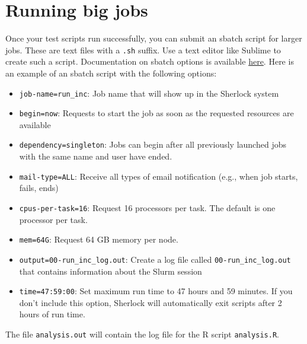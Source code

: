 \documentclass[
]{book}
\providecommand{\tightlist}{%
  \setlength{\itemsep}{0pt}\setlength{\parskip}{0pt}}
\begin{document}
\hypertarget{running-big-jobs-1}{%
\section{Running big jobs}\label{running-big-jobs-1}}

Once your test scripts run successfully, you can submit an sbatch script for larger jobs. These are text files with a \texttt{.sh} suffix. Use a text editor like Sublime to create such a script. Documentation on sbatch options is available \href{https://slurm.schedmd.com/sbatch.html}{here}. Here is an example of an sbatch script with the following options:

\begin{itemize}
\tightlist
\item
  \texttt{job-name=run\_inc}: Job name that will show up in the Sherlock system
\item
  \texttt{begin=now}: Requests to start the job as soon as the requested resources are available
\item
  \texttt{dependency=singleton}: Jobs can begin after all previously launched jobs with the same name and user have ended.
\item
  \texttt{mail-type=ALL}: Receive all types of email notification (e.g., when job starts, fails, ends)
\item
  \texttt{cpus-per-task=16}: Request 16 processors per task. The default is one processor per task.
\item
  \texttt{mem=64G}: Request 64 GB memory per node.
\item
  \texttt{output=00-run\_inc\_log.out}: Create a log file called \texttt{00-run\_inc\_log.out} that contains information about the Slurm session
\item
  \texttt{time=47:59:00}: Set maximum run time to 47 hours and 59 minutes. If you don't include this option, Sherlock will automatically exit scripts after 2 hours of run time.
\end{itemize}

The file \texttt{analysis.out} will contain the log file for the R script \texttt{analysis.R}.
\end{document}
